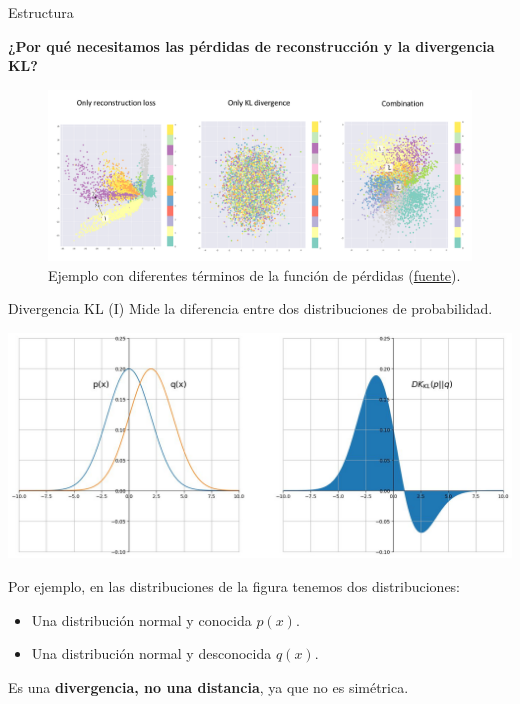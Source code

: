 \begin{frame}{Estructura}

\textbf{¿Por qué necesitamos las pérdidas de reconstrucción y la divergencia KL?}


\begin{figure}
    \centering
    \includegraphics[width=1\textwidth]{Slides/figures/02_Metodos_Generativos/vae-comparison-mse-and-kl.png}
    \caption{Ejemplo con diferentes términos de la función de pérdidas (\href{https://www.jeremyjordan.me/content/images/2018/03/Screen-Shot-2018-03-18-at-7.22.24-PM.png}{fuente}).}
    \label{fig:enter-label}
\end{figure}

\end{frame}

\begin{frame}{Divergencia KL (I)}
Mide la diferencia entre dos distribuciones de probabilidad.

\begin{center}
    \includegraphics[width=.6\textwidth]{Slides/figures/02_Metodos_Generativos/nn-kl-divergence.png}
\end{center}

Por ejemplo, en las distribuciones de la figura tenemos dos distribuciones:

\begin{itemize}
    \item Una distribución normal y conocida $p(x)$.
    \item Una distribución normal y desconocida $q(x)$.
\end{itemize}

Es una \textbf{divergencia, no una distancia}, ya que no es simétrica.
\end{frame}

